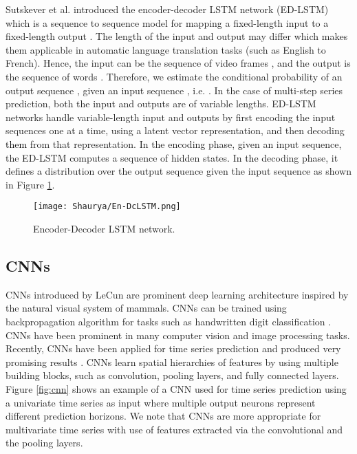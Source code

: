 \documentclass{ieeeaccess}
\begin{document}
 
 Sutskever et al. \cite{NIPS2014_5346} introduced the encoder-decoder LSTM network (ED-LSTM) which is a sequence to sequence model for mapping a fixed-length input to a fixed-length output \cite{cho2014}. The length of the input and output may differ which makes them applicable in automatic language translation tasks (such as English to French). Hence,  the input can be  the sequence of video frames
, and the output is the sequence of words
. Therefore, we estimate the conditional probability of
an output sequence , given an input sequence
, i.e.
. In the case of multi-step series prediction,  both the input and outputs are of
variable lengths. ED-LSTM networks  handle variable-length input and outputs by  first encoding the input sequences one at a time,
 using a latent vector representation,
and then decoding \textcolor{black}{them} from that representation. 
In the encoding phase, given an input sequence, the ED-LSTM computes a sequence of hidden
states\textcolor{black}{.} In \textcolor{black}{the} decoding phase, it defines a distribution over the output sequence   given the input sequence  as shown in Figure \ref{fig:EN-DC LSTM}. 


 

\begin{figure}[htbp!]
  \begin{center}  
   \texttt{[image: Shaurya/En-DcLSTM.png]} 
    \caption{ Encoder-Decoder LSTM network. }
\label{fig:EN-DC LSTM}
  \end{center}
\end{figure}






\subsection{CNNs} 

 CNNs  introduced by LeCun \cite{lecun1990cnn,lecun1998cnn} are  prominent deep learning architecture inspired by the natural visual system of mammals. CNNs can be trained using backpropagation algorithm for tasks such as handwritten digit classification \cite{Hecht1989backprop}. CNNs have been prominent in many computer vision and image processing tasks. Recently, CNNs have been applied for time series prediction and produced very  promising results  \cite{Amarasinghe2017Deepelf,xingjian2015convolutional,wang2017deep}. CNNs   learn spatial hierarchies of features by using multiple building blocks, such as convolution, pooling layers, and fully connected layers.   Figure  \ref{fig:cnn} shows an example of a CNN used for time series prediction using a  univariate time series as input where multiple output neurons represent different prediction horizons. We note that CNNs are more appropriate for multivariate time series  with use of features extracted via the convolutional and the pooling layers. 
 
\end{document}
